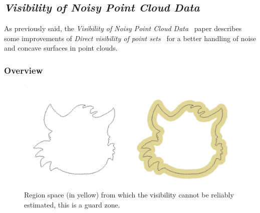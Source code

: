 \subsection{\emph{Visibility of Noisy Point Cloud Data}}
\label{subsc:noisy}
As previously said, the \emph{Visibility of Noisy Point Cloud Data}~\cite{vis2} paper describes some improvements of \emph{Direct visibility of point sets}~\cite{vis1} for a better handling of noise and concave surfaces in point clouds.

\subsubsection{Overview}
\begin{figure}
  \centering
  \includegraphics[scale=0.2]{img/epsilon.png}
  \caption{Region space (in yellow) from which the visibility cannot be reliably estimated, this is a guard zone.}
  \label{fig:epsilon}
\end{figure}


